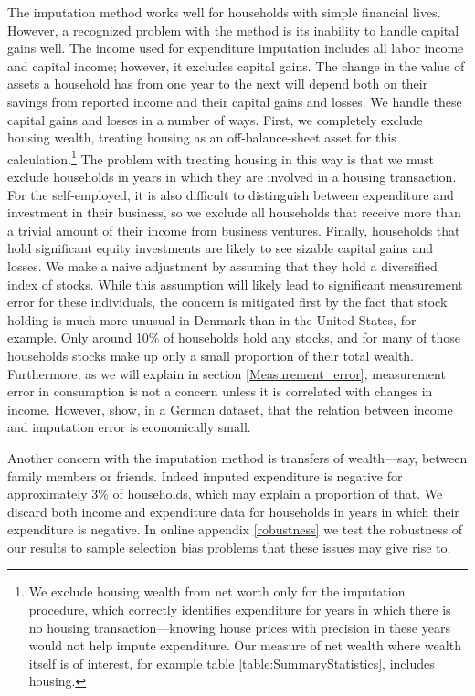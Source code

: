 \documentclass[titlepage]{\econtex}\newcommand{\texname}{ConsumptionHeterogeneity}
\begin{document}
	The imputation method works well for households with simple financial lives. However, a recognized problem with the method is its inability to handle capital gains well. The income used for expenditure imputation includes all labor income and capital income; however, it excludes capital gains. The change in the value of assets a household has from one year to the next will depend both on their  savings from reported income and their capital gains and losses. We handle these capital gains and losses in a number of ways. First, we completely exclude housing wealth, treating housing as an off-balance-sheet asset for this calculation.\footnote{We exclude housing wealth from net worth only for the imputation procedure, which correctly identifies expenditure for years in which there is no housing transaction---knowing house prices with precision in these years would not help impute expenditure. Our measure of net wealth where wealth itself is of interest, for example table \ref{table:SummaryStatistics}, includes housing.} The problem with treating housing in this way is that we must exclude households in years in which they are involved in a housing transaction. For the self-employed, it is also difficult to distinguish between expenditure and investment in their business, so we exclude all households that receive more than a trivial amount of their income from business ventures. Finally, households that hold significant equity investments are likely to see sizable capital gains and losses. We make a naive adjustment by assuming that they hold a diversified index of stocks. While this assumption will likely lead to significant measurement error for these individuals, the concern is mitigated first by the fact that stock holding is much more unusual in Denmark than in the United States, for example. Only around 10\% of households hold any stocks, and for many of those households stocks make up only a small proportion of their total wealth. Furthermore, as we will explain in section \ref{Measurement_error}, measurement error in consumption is not a concern unless it is correlated with changes in income. However, \cite{baker_measurement_2018} show, in a German dataset, that the relation between income and imputation error is economically small. 
	
	Another concern with the imputation method is transfers of wealth---say, between family members or friends. Indeed imputed expenditure is negative for approximately 3\% of households, which may explain a proportion of that. We discard both income and expenditure data for households in years in which their expenditure is negative. In online appendix \ref{robustness} we test the robustness of our results to sample selection bias problems that these issues may give rise to.
	
\end{document}
